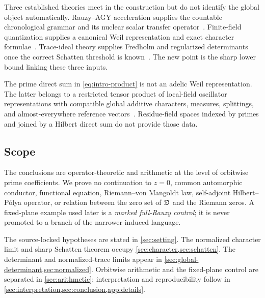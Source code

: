 Three established theories meet in the construction but do not identify the
global object automatically.  Rauzy--AGY acceleration supplies the
countable chronological grammar and its nuclear scalar transfer
operator~\citep{agy2006}.  Finite-field quantization supplies a canonical
Weil representation and exact character formulae~\citep{thomas2008,gurevich2009}.
Trace-ideal theory supplies Fredholm and regularized determinants once the
correct Schatten threshold is known~\citep{simon2005,britz2021}.  The new
point is the sharp lower bound linking these three inputs.

The prime direct sum in \cref{eq:intro-product} is not an adelic Weil
representation.  The latter belongs to a restricted tensor product of
local-field oscillator representations with compatible global additive
characters, measures, splittings, and almost-everywhere reference
vectors~\citep{weil1964}.  Residue-field spaces indexed by primes and joined
by a Hilbert direct sum do not provide those data.

\subsection{Scope}

The conclusions are operator-theoretic and arithmetic at the level of
orbitwise prime coefficients.  We prove no continuation to \(z=0\), common
automorphic conductor, functional equation, Riemann--von Mangoldt law,
self-adjoint Hilbert--P\'olya operator, or relation between the zero set of
\(\mathfrak D\) and the Riemann zeros.  A fixed-plane example used later is a
\emph{marked full-Rauzy control}; it is never promoted to a branch of the
narrower induced language.

The source-locked hypotheses are stated in \cref{sec:setting}.  The
normalized character limit and sharp Schatten theorem occupy
\cref{sec:character,sec:schatten}.  The determinant and normalized-trace
limits appear in \cref{sec:global-determinant,sec:normalized}.  Orbitwise
arithmetic and the fixed-plane control are separated in
\cref{sec:arithmetic}; interpretation and reproducibility follow in
\cref{sec:interpretation,sec:conclusion,app:details}.
